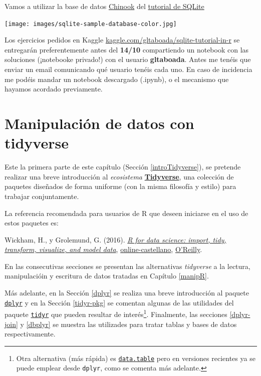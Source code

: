 \documentclass[
]{book}
\begin{document}
Vamos a utilizar la base de datos \href{https://www.sqlitetutorial.net/wp-content/uploads/2018/03/chinook.zip}{Chinook} del \href{https://www.sqlitetutorial.net/sqlite-sample-database/}{tutorial de SQLite}

\texttt{[image: images/sqlite-sample-database-color.jpg]}

Los ejercicios pedidos en Kaggle \href{https://www.kaggle.com/gltaboada/sqlite-tutorial-in-r}{kaggle.com/gltaboada/sqlite-tutorial-in-r} se entregarán preferentemente antes del \textbf{14/10} compartiendo un notebook con las soluciones (¡notebooke privado!) con el usuario \textbf{gltaboada}. Antes me tenéis que enviar un email comunicando qué usuario tenéis cada uno. En caso de incidencia me podéis mandar un notebook descargado (.ipynb), o el mecanismo que hayamos acordado previamente.

\chapter{Manipulación de datos con tidyverse}\label{tidyverse}

Este la primera parte de este capítulo (Sección \ref{introTidyverse}), se pretende realizar una breve introducción al \emph{ecosistema} \href{https://dplyr.tidyverse.org}{\textbf{Tidyverse}}, una colección de paquetes diseñados de forma uniforme (con la misma filosofía y estilo) para trabajar conjuntamente.

La referencia recomendada para usuarios de R que deseen iniciarse en el uso de estos paquetes es:

Wickham, H., y Grolemund, G. (2016). \emph{\href{http://r4ds.had.co.nz}{R for data science: import, tidy, transform, visualize, and model data}}, \href{https://es.r4ds.hadley.nz}{online-castellano}, \href{http://shop.oreilly.com/product/0636920034407.do}{O'Reilly}.

En las consecutivas secciones se presentan las alternativas \emph{tidyverse} a la lectura, manipulacióin y escritura de datos tratadas en Capítulo \ref{manipR}.

Más adelante, en la Sección \ref{dplyr} se realiza una breve introducción al paquete \href{https://dplyr.tidyverse.org}{\texttt{dplyr}} y en la Sección \ref{tidyr-pkg} se comentan algunas de las utilidades del paquete \href{https://tidyr.tidyverse.org}{\texttt{tidyr}} que pueden resultar de interés\footnote{Otra alternativa (más rápida) es \href{https://rdatatable.gitlab.io/data.table}{\texttt{data.table}} pero en versiones recientes ya se puede emplear desde \texttt{dplyr}, como se comenta más adelante.}. Finalmente, las secciones \ref{dplyr-join} y \ref{dbplyr} se muestra las utilizades para tratar tablas y bases de datos respectivamente.
\end{document}
